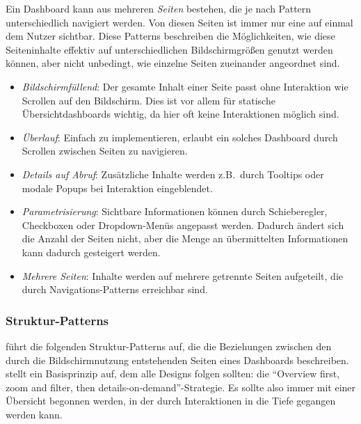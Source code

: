 \autocite[S. 4]{Bach.DashboardDesignPatterns.2023} Ein Dashboard kann aus mehreren \emph{Seiten} bestehen, die je nach Pattern unterschiedlich navigiert werden.
Von diesen Seiten ist immer nur eine auf einmal dem Nutzer sichtbar.
Diese Patterns beschreiben die Möglichkeiten, wie diese Seiteninhalte effektiv auf unterschiedlichen Bildschirmgrößen genutzt werden können, aber nicht unbedingt, wie einzelne Seiten zueinander angeordnet sind.

\begin{itemize}
    \item \emph{Bildschirmfüllend}: Der gesamte Inhalt einer Seite passt ohne Interaktion wie Scrollen auf den Bildschirm.
    Dies ist vor allem für statische Übersichtdashboards wichtig, da hier oft keine Interaktionen möglich sind.
    \item \emph{Überlauf}: Einfach zu implementieren, erlaubt ein solches Dashboard durch Scrollen zwischen Seiten zu navigieren.
    \item \emph{Details auf Abruf}: Zusätzliche Inhalte werden z.B.\ durch Tooltips oder modale Popups bei Interaktion eingeblendet.
    \item \emph{Parametrisierung}: Sichtbare Informationen können durch Schieberegler, Checkboxen oder Dropdown-Menüs angepasst werden.
    Dadurch ändert sich die Anzahl der Seiten nicht, aber die Menge an übermittelten Informationen kann dadurch gesteigert werden.
    \item \emph{Mehrere Seiten}: Inhalte werden auf mehrere getrennte Seiten aufgeteilt, die durch Navigations-Patterns erreichbar sind.
\end{itemize}

\subsubsection{Struktur-Patterns}

\autocite[S. 4]{Bach.DashboardDesignPatterns.2023} führt die folgenden Struktur-Patterns auf, die die Beziehungen zwischen den durch die Bildschirmnutzung entstehenden Seiten eines Dashboards beschreiben.
\autocite{Shneiderman.TheEyesHaveIt.1996} stellt ein Basisprinzip auf, dem alle Designs folgen sollten: die "`Overview first, zoom and filter, then details-on-demand"'-Strategie.
Es sollte also immer mit einer Übersicht begonnen werden, in der durch Interaktionen in die Tiefe gegangen werden kann.

